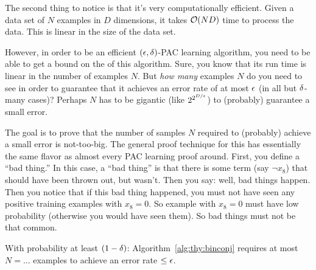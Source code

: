 The second thing to notice is that it's very computationally
efficient.  Given a data set of $N$ examples in $D$ dimensions, it
takes $\mathcal{O}(ND)$ time to process the data.  This is linear in the size
of the data set.

However, in order to be an efficient $(\epsilon,\delta)$-PAC learning
algorithm, you need to be able to get a bound on the  of this algorithm.  Sure, you know that its run time is
linear in the number of examples $N$.  But \emph{how many} examples $N$
do you need to see in order to guarantee that it achieves an error
rate of at most $\epsilon$ (in all but $\delta$-many cases)?  Perhaps $N$ has
to be gigantic (like $2^{2^{D/\epsilon}}$) to (probably) guarantee a small
error.

The goal is to prove that the number of samples $N$ required to
(probably) achieve a small error is not-too-big.  The general proof
technique for this has essentially the same flavor as almost every PAC
learning proof around.  First, you define a ``bad thing.''  In this
case, a ``bad thing'' is that there is some term (say $\lnot x_8$)
that should have been thrown out, but wasn't.  Then you say: well, bad
things happen.  Then you notice that if this bad thing happened, you
must not have seen any positive training examples with $x_8=0$.  So
example with $x_8=0$ must have low probability (otherwise you would
have seen them).  So bad things must not be that common.

\begin{theorem} \label{thm:thy:conj}
  With probability at least $(1-\delta)$: Algorithm~\ref{alg:thy:binconj}
  requires at most $N = \dots$ examples to achieve an error rate $\leq
  \epsilon$.
\end{theorem}

